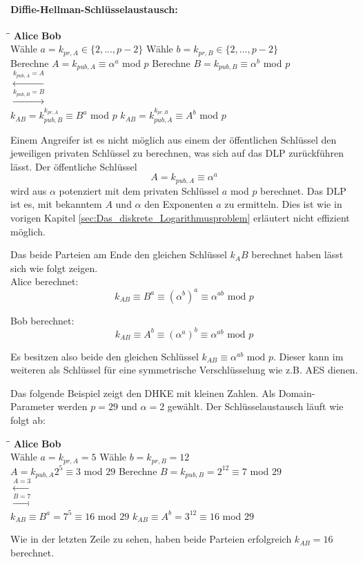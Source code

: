 \paragraph{Diffie-Hellman-Schlüsselaustausch:}
\begin{tabbing}
\qquad \qquad \qquad \qquad \qquad \qquad \qquad \qquad \= \qquad \qquad \qquad \= \qquad \qquad \qquad \qquad \qquad \qquad \qquad \qquad \kill
\textbf{Alice} \> \> \textbf{Bob}\\
Wähle $a=k_{pr,A} \in \{2,..., p-2\}$ \> \> Wähle $b=k_{pr,B} \in \{2,..., p-2\}$\\
Berechne $A = k_{pub,A} \equiv \alpha ^a$ mod $p$ \> \> Berechne $B = k_{pub,B} \equiv \alpha ^b$ mod $p$\\
\> $\xleftarrow{k_{pub,A} = A}$ \> \\
\> $\xrightarrow{k_{pub,B} = B}$ \> \\
$k_{AB} = k_{pub,B}^{k_{pr,A}} \equiv B^a$ mod $p$ \> \> $k_{AB} = k_{pub,A}^{k_{pr,B}} \equiv A^b$ mod $p$
\end{tabbing}

Einem Angreifer ist es nicht möglich aus einem der öffentlichen Schlüssel den jeweiligen privaten Schlüssel zu berechnen, was sich auf das DLP zurückführen lässt. Der öffentliche Schlüssel $$A = k_{pub,A} \equiv \alpha ^a$$ wird aus $\alpha$ potenziert mit dem privaten Schlüssel $a$ mod $p$ berechnet. Das DLP ist es, mit bekanntem $A$ und $\alpha$ den Exponenten $a$ zu ermitteln. Dies ist wie in vorigen Kapitel \ref{sec:Das_diskrete_Logarithmusproblem} erläutert nicht effizient möglich.

Das beide Parteien am Ende den gleichen Schlüssel $k_AB$ berechnet haben lässt sich wie folgt zeigen.\\

Alice berechnet:
$$k_{AB} \equiv B^a \equiv (\alpha ^b)^a \equiv \alpha^{ab} \text{ mod } p$$

Bob berechnet:
$$k_{AB} \equiv A^b \equiv (\alpha ^a)^b \equiv \alpha^{ab} \text{ mod } p$$

Es besitzen also beide den gleichen Schlüssel $k_{AB} \equiv \alpha^{ab} \text{ mod } p$. Dieser kann im weiteren als Schlüssel für eine symmetrische Verschlüsselung wie z.B. AES dienen.

Das folgende Beispiel zeigt den DHKE mit kleinen Zahlen. Als Domain-Parameter werden $p=29$ und $\alpha = 2$ gewählt. Der Schlüsselaustausch läuft wie folgt ab:
\begin{tabbing}
\qquad \qquad \qquad \qquad \qquad \qquad \qquad \qquad \= \qquad \qquad \qquad \= \qquad \qquad \qquad \qquad \qquad \qquad \qquad \qquad \kill
\textbf{Alice} \> \> \textbf{Bob}\\
Wähle $a=k_{pr,A} = 5$ \> \> Wähle $b=k_{pr,B} = 12$\\
$A = k_{pub,A} 2^5 \equiv 3$ mod $29$ \> \> Berechne $B = k_{pub,B} = 2^12 \equiv 7$ mod $29$\\
\> $\xleftarrow{A = 3}$ \> \\
\> $\xrightarrow{B = 7}$ \> \\
$k_{AB} \equiv B^a = 7^5 \equiv 16$ mod $29$ \> \> $k_{AB} \equiv A^b = 3^{12} \equiv 16$ mod $29$
\end{tabbing}

Wie in der letzten Zeile zu sehen, haben beide Parteien erfolgreich $k_{AB} = 16$ berechnet.\cite{Paar.2016}